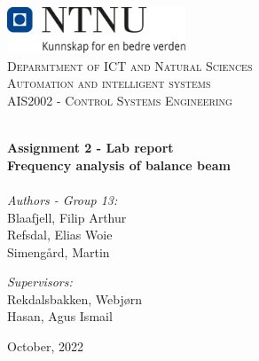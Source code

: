 
\begin{titlepage}
\vbox{ }
\vbox{ }
\begin{center}
\includegraphics[width=0.40\textwidth]{Images/NTNU_logo.png} \\[1cm]
\textsc{\LARGE Deparmtment of ICT and Natural Sciences}\\[1.5cm]
\textsc{\LARGE Automation and intelligent systems}\\ [1.5cm]
\textsc{\Large AIS2002 - Control Systems Engineering}\\[0.5cm]
\vbox{ }

\HRule \\[0.4cm]

{ \huge \bfseries Assignment 2 - Lab report}\\[0.4cm]
{ \large \bfseries Frequency analysis of balance beam}\\[0.4cm]
\HRule \\[1.5cm]

\large
\emph{Authors - Group 13:}\\[0.2cm]
Blaafjell, Filip Arthur\\[0.1cm]
Refsdal, Elias Woie\\[0.1cm]
Simengård, Martin\\
\vfill

\large
\emph{Supervisors:}\\ [0.2cm]
Rekdalsbakken, Webjørn\\[0.1cm]
Hasan, Agus Ismail \\[0.1cm]
\vfill




{\large October, 2022}
\end{center}
\end{titlepage}